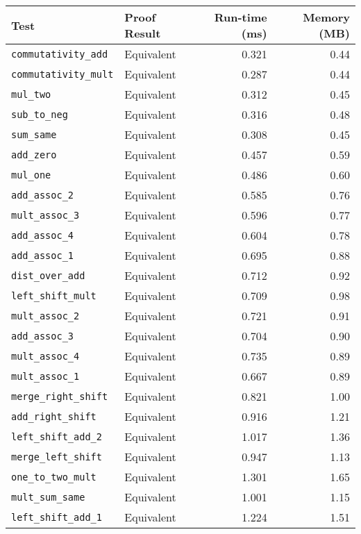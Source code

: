 \begin{tabular}{llrr}
\toprule
\textbf{Test} & \textbf{Proof Result} & \textbf{Run-time (ms)} & \textbf{Memory (MB)} \\
\midrule
\texttt{commutativity\_add} & Equivalent & 0.321 & 0.44 \\
\texttt{commutativity\_mult} & Equivalent & 0.287 & 0.44 \\
\texttt{mul\_two} & Equivalent & 0.312 & 0.45 \\
\texttt{sub\_to\_neg} & Equivalent & 0.316 & 0.48 \\
\texttt{sum\_same} & Equivalent & 0.308 & 0.45 \\
\texttt{add\_zero} & Equivalent & 0.457 & 0.59 \\
\texttt{mul\_one} & Equivalent & 0.486 & 0.60 \\
\texttt{add\_assoc\_2} & Equivalent & 0.585 & 0.76 \\
\texttt{mult\_assoc\_3} & Equivalent & 0.596 & 0.77 \\
\texttt{add\_assoc\_4} & Equivalent & 0.604 & 0.78 \\
\texttt{add\_assoc\_1} & Equivalent & 0.695 & 0.88 \\
\texttt{dist\_over\_add} & Equivalent & 0.712 & 0.92 \\
\texttt{left\_shift\_mult} & Equivalent & 0.709 & 0.98 \\
\texttt{mult\_assoc\_2} & Equivalent & 0.721 & 0.91 \\
\texttt{add\_assoc\_3} & Equivalent & 0.704 & 0.90 \\
\texttt{mult\_assoc\_4} & Equivalent & 0.735 & 0.89 \\
\texttt{mult\_assoc\_1} & Equivalent & 0.667 & 0.89 \\
\texttt{merge\_right\_shift} & Equivalent & 0.821 & 1.00 \\
\texttt{add\_right\_shift} & Equivalent & 0.916 & 1.21 \\
\texttt{left\_shift\_add\_2} & Equivalent & 1.017 & 1.36 \\
\texttt{merge\_left\_shift} & Equivalent & 0.947 & 1.13 \\
\texttt{one\_to\_two\_mult} & Equivalent & 1.301 & 1.65 \\
\texttt{mult\_sum\_same} & Equivalent & 1.001 & 1.15 \\
\texttt{left\_shift\_add\_1} & Equivalent & 1.224 & 1.51 \\
\bottomrule
\end{tabular}
